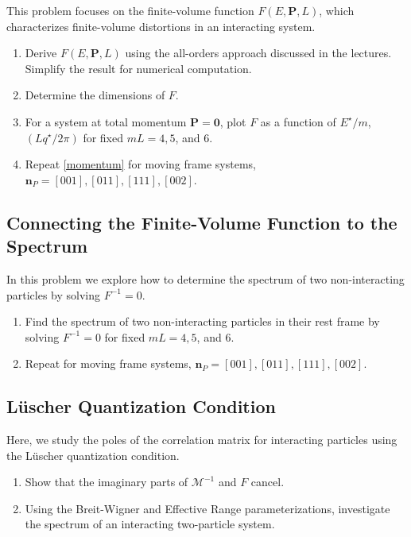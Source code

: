 \documentclass[11pt]{latex/exercise}
\begin{document}
This problem focuses on the finite-volume function $F(E,\mathbf{P},L)$, which characterizes finite-volume distortions in an interacting system.
\begin{enumerate}
    \item Derive $F(E,\mathbf{P},L)$ using the all-orders approach discussed in the lectures. Simplify the result for numerical computation.
    \item Determine the dimensions of $F$.
    \item \label{momentum} For a system at total momentum $\mathbf{P} = \mathbf{0}$, plot $F$ as a function of $E^{\star}/m$, $(Lq^{\star}/2\pi)$ for fixed $mL = 4, 5$, and 6.
    \item Repeat \eqref{momentum} for moving frame systems, $\mathbf{n}_P = [001], [011], [111], [002]$.
\end{enumerate}

\subsection{Connecting the Finite-Volume Function to the Spectrum}

In this problem we explore how to determine the spectrum of two non-interacting particles by solving $F^{-1} = 0$.

\begin{enumerate}
    \item \label{spectrum} Find the spectrum of two non-interacting particles in their rest frame by solving $F^{-1} = 0$ for fixed $mL = 4, 5$, and 6.
    \item Repeat \label{spectrum} for moving frame systems, $\mathbf{n}_P = [001], [011], [111], [002]$.
\end{enumerate}

\subsection{L{\"u}scher Quantization Condition}

Here, we study the poles of the correlation matrix for interacting particles using the L\"uscher quantization condition.
\begin{enumerate}
    \item Show that the imaginary parts of $\mathcal{M}^{-1}$ and $F$ cancel.
    \item Using the Breit-Wigner and Effective Range parameterizations, investigate the spectrum of an interacting two-particle system.
\end{enumerate}
\end{document}
